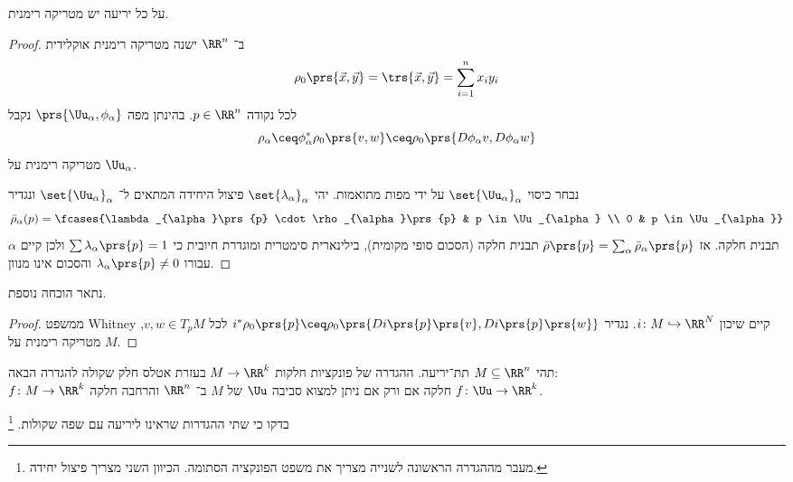 \documentclass[a4paper,10pt,twoside,openany]{book}
\begin{document}
\begin{theorem}
על כל יריעה יש מטריקה רימנית.
\end{theorem}
\begin{proof}
ב־%
$\RR^n$
ישנה מטריקה רימנית אוקלידית
\[\rho_0\prs{\vec{x},\vec{y}} = \trs{\vec{x},\vec{y}} = \sum_{i=1}^n x_i y_i\]
לכל נקודה
$p \in \RR^n$.
בהינתן מפה
$\prs{\Uu_{\alpha}, \phi_{\alpha}}$
נקבל
\[\rho_{\alpha} \ceq \phi_{\alpha}^* \rho_0 \prs{v, w} \ceq \rho_0 \prs{D \phi_{\alpha} v, D\phi_{\alpha} w}\]
מטריקה רימנית על
$\Uu_{\alpha}$.

נבחר כיסוי
$\set{\Uu_{\alpha}}_{\alpha}$
על ידי מפות מתואמות.
יהי
$\set{\lambda_{\alpha}}_{\alpha}$
פיצול היחידה המתאים ל־%
$\set{\Uu_{\alpha}}_{\alpha}$
ונגדיר
\[\bar{\rho}_{\alpha}(p) = \fcases{\lambda_{\alpha}\prs{p} \cdot \rho_{\alpha}\prs{p} & p \in \Uu_{\alpha} \\ 0 & p \in \Uu_{\alpha}}\]
תבנית חלקה.
אז
$\bar{\rho}\prs{p} = \sum_{\alpha} \bar{\rho}_{\alpha}\prs{p}$
תבנית חלקה (הסכום סופי מקומית), בילינארית סימטרית ומוגדרת חיובית כי
$\sum \lambda_{\alpha}\prs{p} = 1$
ולכן קיים
$\alpha$
עבורו
$\lambda_{\alpha}\prs{p} \neq 0$
והסכום אינו מנוון.
\end{proof}

נתאר הוכחה נוספת.

\begin{proof}
ממשפט
\textenglish{Whitney}
קיים שיכון
$i \colon M \hookrightarrow \RR^N$.
נגדיר
$i^* \rho_0\prs{p} \ceq \rho_0 \prs{Di\prs{p}\prs{v},Di\prs{p}\prs{w}}$
לכל
$v,w \in T_p M$,
מטריקה רימנית על
$M$.
\end{proof}
\begin{exercise}
תהי
$M \subseteq \RR^n$
תת־יריעה. ההגדרה של פונקציות חלקות
$M \to \RR^k$
בעזרת אטלס חלק שקולה להגדרה הבאה:
\\
$f \colon M \to \RR^k$
חלקה אם ורק אם ניתן למצוא סביבה
$\Uu$
של
$M$
ב־%
$\RR^n$
והרחבה חלקה
$f \colon \Uu \to \RR^k$.
\end{exercise}
\begin{exercise}
בדקו כי שתי ההגדרות שראינו ליריעה עם שפה שקולות.%
\footnote{מעבר מההגדרה הראשונה לשנייה מצריך את משפט הפונקציה הסתומה. הכיוון השני מצריך פיצול יחידה.}
\end{exercise}
\end{document}
